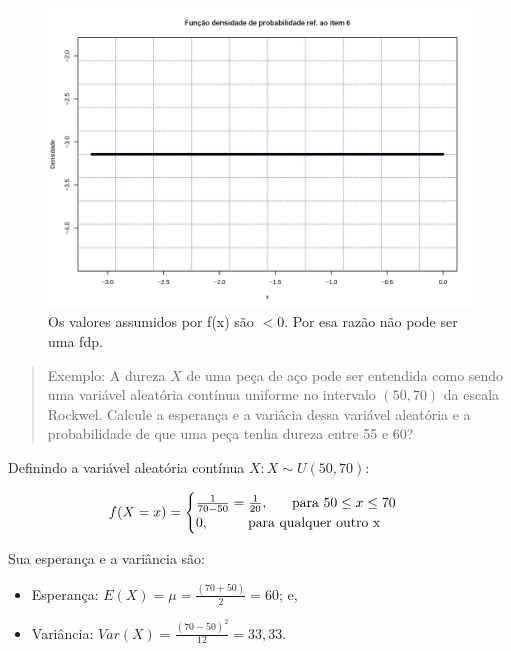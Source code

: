 \documentclass[
]{book}
\providecommand{\tightlist}{%
  \setlength{\itemsep}{0pt}\setlength{\parskip}{0pt}}
\begin{document}
\hfill\break

\begin{figure}

{\centering \includegraphics[width=0.6\linewidth]{images6/item6} 

}

\caption{Os valores assumidos por f(x) são $ < 0$. Por esa razão não pode ser uma fdp.}\label{fig:fig21}
\end{figure}

\begin{quote}
Exemplo: A dureza \(X\) de uma peça de aço pode ser entendida como sendo uma variável aleatória contínua uniforme no intervalo \((50,70)\) da escala Rockwel. Calcule a esperança e a variâcia dessa variável aleatória e a probabilidade de que uma peça tenha dureza entre 55 e 60?
\end{quote}

\hfill\break

Definindo a variável aleatória contínua \(X:X \sim U(50,70)\):

\hfill\break

\[
f(X=x)=
\begin{cases}
\frac{1}{70-50}=\frac{1}{20}, \hspace{0.6cm} \text{para } 50 \le x \le 70 \\
0, \hspace{1cm} \text{para qualquer outro x}\\
\end{cases}
\]

\hfill\break

Sua esperança e a variância são:

\hfill\break

\begin{itemize}
\tightlist
\item
  Esperança: \(E(X) = \mu = \frac{(70+50)}{2}=60\); e,\\
\item
  Variância: \(Var(X) = \frac{(70-50)^{2} }{12}=33,33\).
\end{itemize}
\end{document}
